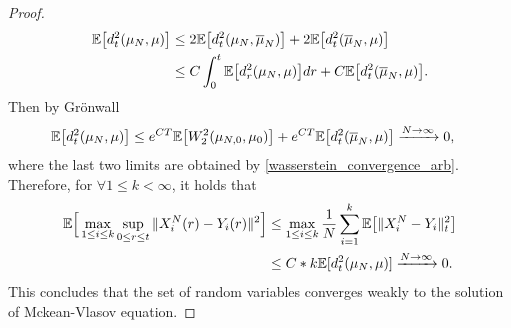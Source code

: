 \begin{proof}
  \begin{align*}
    \mathbb{E}\big[d_t^2(\mu_N,\mu )\big] &\le  2 \mathbb{E}\big[d_t^2(\mu_N,\overline{\mu }_N )\big] + 2 \mathbb{E}\big[d_t^2(\overline\mu_N,\mu )\big]\\
                          &\le  C \int_0^{t} \mathbb{E}\big[d_r^2(\mu_N,\mu )\big] dr + C\mathbb{E}\big[d_t^2(\overline{\mu}_N,\mu )\big]
  .\end{align*}
  Then by Grönwall 
  \begin{align*}
    \mathbb{E}\big[d_t^2(\mu_N,\mu )\big] &\le e^{CT} \mathbb{E}\big[W_2^2(\mu_{N,0},\mu_0)\big] + e^{CT} \mathbb{E}\big[d_t^2(\overline{\mu }_N,\mu  )\big] \xrightarrow{N\to \infty} 0 
,\end{align*}
 where the last two limits are obtained by \autoref{wasserstein_convergence_arb}. Therefore, for $\forall  1\le k < \infty$, it holds that
  \begin{align*}
    \mathbb{E}\Big[\max_{1\le i \le  k}\sup_{0\le r\le t} \|X_i^{N}(r) - Y_i(r) \|^2\Big] &\le \max_{1 \le i\le k} \frac{1}{N}\sum_{i=1}^{k} \mathbb{E}\big[\|X_i^{N}-Y_i \|_t^2\big] \\
         &\le  C*k\mathbb{E}[d_t^2(\mu_N,\mu   )]                                                                \xrightarrow{N\to \infty} 0
  .\end{align*}
  This concludes that the set of random variables converges weakly to the solution of Mckean-Vlasov equation.
\end{proof}